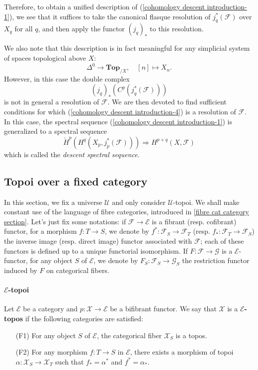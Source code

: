 Therefore, to obtain a unified description of (\ref{cohomology descent introduction-1}), we see that it suffices to take the canonical flasque resolution of $j_q^*(\mathscr{F})$ over $X_q$ for all $q$, and then apply the functor $(j_q)_*$ to this resolution.\par
We also note that this description is in fact meaningful for any simplicial system of spaces topological above $X$:
\[\Delta^0\to \mathbf{Top}_{/X},\quad [n]\mapsto X_n.\]
However, in this case the double complex
\begin{equation}\label{cohomology descent introduction-4}
(j_q)_*(C^p(j_q^*(\mathscr{F})))
\end{equation}
is not in general a resolution of $\mathscr{F}$. We are then devoted to find sufficient conditions for which (\ref{cohomology descent introduction-4}) is a resolution of $\mathscr{F}$. In this case, the spectral sequence (\ref{cohomology descent introduction-1}) is generalized to a spectral sequence
\begin{equation}\label{cohomology descent introduction-5}
\check{H}^p(H^q(X_p,j_p^*(\mathscr{F})))\Rightarrow H^{p+q}(X,\mathscr{F})
\end{equation}
which is called the \textit{descent spectral sequence}.

\subsection{Topoi over a fixed category}
In this section, we fix a universe $\mathscr{U}$ and only consider $\mathscr{U}$-topoi. We shall make constant use of the language of fibre categories, introduced in \autoref{fibre cat category section}. Let's just fix some notations: if $\mathcal{F}\to \mathcal{E}$ is a fibrant (resp. cofibrant) functor, for a morphism $f:T\to S$, we denote by $f^*:\mathcal{F}_S\to \mathcal{F}_T$ (resp. $f_*:\mathcal{F}_T\to \mathcal{F}_S$) the inverse image (resp. direct image) functor associated with $\mathcal{F}$; each of these functors is defined up to a unique functorial isomorphism. If $F:\mathcal{F}\to \mathcal{G}$ is a $\mathcal{E}$-functor, for any object $S$ of $\mathcal{E}$, we denote by $F_S:\mathcal{F}_S\to \mathcal{G}_S$ the restriction functor induced by $F$ on categorical fibers.

\paragraph{\texorpdfstring{$\mathcal{E}$}{E}-topoi}
Let $\mathcal{E}$ be a category and $p:\mathcal{X}\to \mathcal{E}$ be a bifibrant functor. We say that $\mathcal{X}$ is a \textbf{$\mathcal{E}$-topos} if the following categories are satisfied:
\begin{enumerate}[leftmargin=40pt]
\item[(F1)] For any object $S$ of $\mathcal{E}$, the categorical fiber $\mathcal{X}_S$ is a topos.
\item[(F2)] For any morphism $f:T\to S$ in $\mathcal{E}$, there exists a morphism of topoi $\alpha:\mathcal{X}_S\to \mathcal{X}_T$ such that $f_*=\alpha^*$ and $f^*=\alpha_*$.
\end{enumerate}

